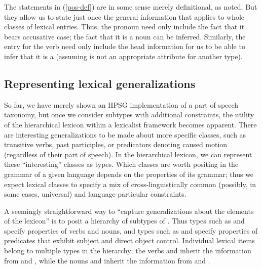 \documentclass[output=paper,biblatex,babelshorthands,newtxmath,draftmode,colorlinks,citecolor=brown]{langscibook}
\begin{document}
The statements in (\ref{pos-def}) are in some sense merely definitional, as noted.
But they allow us to state just once the general information that applies to whole classes of lexical entries.
Thus, the pronoun  need only include the fact that it bears accusative case; the fact that it is a noun can be inferred. 
Similarly, the entry for the verb  need only include the head information \avm{[aux & $+$]} for us to be able to infer that it is a  (assuming  is not an appropriate attribute for another type).

\subsection{Representing lexical generalizations}

So far, we have merely shown an HPSG implementation of a part of speech taxonomy, but once we consider subtypes with additional constraints, the utility of the hierarchical lexicon within a lexicalist framework becomes apparent.
There are interesting generalizations to be made about more specific classes, such as transitive verbs, past participles, or predicators denoting caused motion (regardless of their part of speech).
In the hierarchical lexicon, we can represent these ``interesting'' classes as types.
Which classes are worth positing in the grammar of a given language depends on the properties of its grammar; thus we expect lexical classes to specify a mix of cross-linguistically common (possibly, in some cases, universal) and language-particular constraints.

A seemingly straightforward way to ``capture generalizations about the elements of the lexicon'' is to posit a hierarchy of subtypes of .
Thus types such as  and   specify properties of verbs and nouns, and types such	as  and  specify properties of predicates that exhibit subject and direct object control.
Individual lexical items belong to multiple types in the hierarchy; the verbs  and  inherit the information from  and , while the nouns  and  inherit the information from  and .
\end{document}

